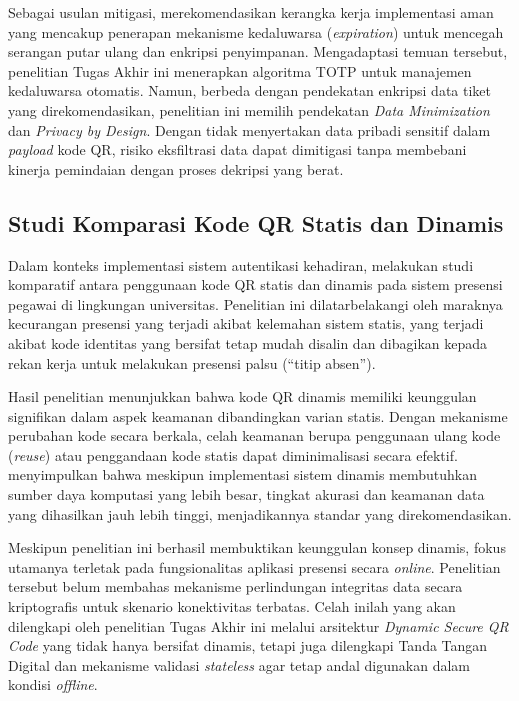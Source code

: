 Sebagai usulan mitigasi, \textcite{sung2015security} merekomendasikan kerangka kerja implementasi aman yang mencakup penerapan mekanisme kedaluwarsa (\textit{expiration}) untuk mencegah serangan putar ulang dan enkripsi penyimpanan. Mengadaptasi temuan tersebut, penelitian Tugas Akhir ini menerapkan algoritma TOTP untuk manajemen kedaluwarsa otomatis. Namun, berbeda dengan pendekatan enkripsi data tiket yang direkomendasikan, penelitian ini memilih pendekatan \textit{Data Minimization} dan \textit{Privacy by Design}. Dengan tidak menyertakan data pribadi sensitif dalam \textit{payload} kode QR, risiko eksfiltrasi data dapat dimitigasi tanpa membebani kinerja pemindaian dengan proses dekripsi yang berat.

\subsection{Studi Komparasi Kode QR Statis dan Dinamis}
Dalam konteks implementasi sistem autentikasi kehadiran, \textcite{yanuarafi2023perbandingan} melakukan studi komparatif antara penggunaan kode QR statis dan dinamis pada sistem presensi pegawai di lingkungan universitas. Penelitian ini dilatarbelakangi oleh maraknya kecurangan presensi yang terjadi akibat kelemahan sistem statis, yang terjadi akibat kode identitas yang bersifat tetap mudah disalin dan dibagikan kepada rekan kerja untuk melakukan presensi palsu (``titip absen'').

Hasil penelitian menunjukkan bahwa kode QR dinamis memiliki keunggulan signifikan dalam aspek keamanan dibandingkan varian statis. Dengan mekanisme perubahan kode secara berkala, celah keamanan berupa penggunaan ulang kode (\textit{reuse}) atau penggandaan kode statis dapat diminimalisasi secara efektif. \textcite{yanuarafi2023perbandingan} menyimpulkan bahwa meskipun implementasi sistem dinamis membutuhkan sumber daya komputasi yang lebih besar, tingkat akurasi dan keamanan data yang dihasilkan jauh lebih tinggi, menjadikannya standar yang direkomendasikan.

Meskipun penelitian ini berhasil membuktikan keunggulan konsep dinamis, fokus utamanya terletak pada fungsionalitas aplikasi presensi secara \textit{online}. Penelitian tersebut belum membahas mekanisme perlindungan integritas data secara kriptografis untuk skenario konektivitas terbatas. Celah inilah yang akan dilengkapi oleh penelitian Tugas Akhir ini melalui arsitektur \textit{Dynamic Secure QR Code} yang tidak hanya bersifat dinamis, tetapi juga dilengkapi Tanda Tangan Digital dan mekanisme validasi \textit{stateless} agar tetap andal digunakan dalam kondisi \textit{offline}.

